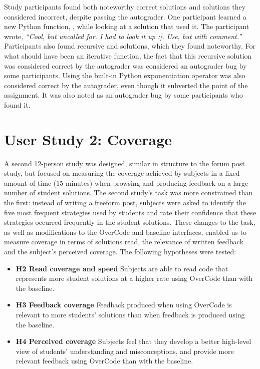 Study participants found both noteworthy correct solutions and solutions they considered incorrect, despite passing the autograder. One participant learned a new Python function, , while looking at a solution that used it. The participant wrote, \textit{``Cool, but uncalled for. I had to look it up :]. Use, but with comment.''} Participants also found recursive  and  solutions, which they found noteworthy. For what should have been an iterative  function, the fact that this recursive solution was considered correct by the autograder was considered an autograder bug by some participants. Using the built-in Python exponentiation operator \codevar{**} was also considered correct by the autograder, even though it subverted the point of the assignment. It was also noted as an autograder bug by some participants who found it.
\section{User Study 2: Coverage}

A second 12-person study was designed, similar in structure to the forum post study, but focused on measuring the coverage achieved by subjects in a fixed amount of time (15 minutes) when browsing and producing feedback on a large number of student solutions. The second study's task was more constrained than the first: instead of writing a freeform post, subjects were asked to identify the five most frequent strategies used by students and rate their confidence that these strategies occurred frequently in the student solutions. These changes to the task, as well as modifications to the OverCode and baseline interfaces, enabled us to measure coverage in terms of solutions read, the relevance of written feedback and the subject's perceived coverage. The following hypotheses were tested:

\begin{itemize}
\item {\bf H2 Read coverage and speed} Subjects are able to read code that represents more student solutions at a higher rate using OverCode than with the baseline. 

\item {\bf H3 Feedback coverage} Feedback produced when using OverCode is relevant to more students' solutions than when feedback is produced using the baseline.

\item {\bf H4 Perceived coverage} Subjects feel that they develop a better high-level view of students' understanding and misconceptions, and provide more relevant feedback using OverCode than with the baseline.

\end{itemize}

